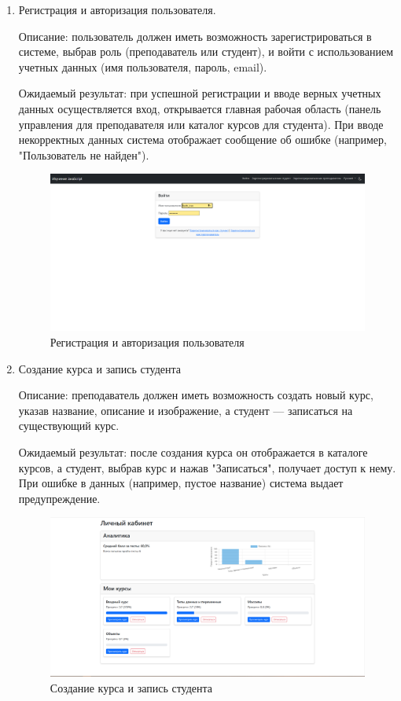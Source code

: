 	\begin{enumerate}
	
	\item Регистрация и авторизация пользователя.
	
Описание: пользователь должен иметь возможность зарегистрироваться в системе, выбрав роль (преподаватель или студент), и войти с использованием учетных данных (имя пользователя, пароль, email).
	
Ожидаемый результат: при успешной регистрации и вводе верных учетных данных осуществляется вход, открывается главная рабочая область (панель управления для преподавателя или каталог курсов для студента). При вводе некорректных данных система отображает сообщение об ошибке (например, "Пользователь не найден").
	
	\begin{figure}[ht]
		\centering
		\includegraphics[width=1\textwidth]{images/регистр} 
		\caption{Регистрация и авторизация пользователя}
		\label{login:image}
	\end{figure}
	
	\item Создание курса и запись студента
	
Описание: преподаватель должен иметь возможность создать новый курс, указав название, описание и изображение, а студент — записаться на существующий курс.
	
Ожидаемый результат: после создания курса он отображается в каталоге курсов, а студент, выбрав курс и нажав "Записаться", получает доступ к нему. При ошибке в данных (например, пустое название) система выдает предупреждение.
	
\begin{figure}[ht]
		\centering
		\includegraphics[width=1\textwidth]{images/запись} 
		\caption{Создание курса и запись студента}
		\label{enroll:image}
\end{figure}
	

\end{enumerate}

